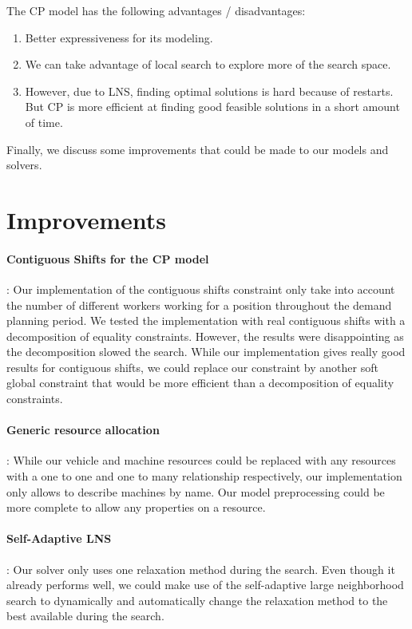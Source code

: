 \documentclass[../thesis.tex]{subfiles}
\begin{document}
The CP model has the following advantages / disadvantages:
\begin{enumerate}[leftmargin=1.5cm]
  \item Better expressiveness for its modeling.
  \item We can take advantage of local search to explore more of the search space.
  \item However, due to LNS, finding optimal solutions is hard because of restarts. But CP is more efficient at 
  finding good feasible solutions in a short amount of time.
\end{enumerate}



Finally, we discuss some improvements that could be made to our models and solvers.

\section{Improvements}

\paragraph{Contiguous Shifts for the CP model}: Our implementation of the contiguous shifts constraint only take into account 
the number of different workers working for a position throughout the demand planning period.
We tested the implementation with real contiguous shifts with a decomposition of equality constraints. However, the results 
were disappointing as the decomposition slowed the search. While our implementation gives really good results for contiguous shifts,
we could replace our constraint by another soft global constraint that would be more efficient than 
a decomposition of equality constraints.

\paragraph{Generic resource allocation}: While our vehicle and machine resources could be replaced with 
any resources with a one to one and one to many relationship respectively, our implementation only allows to describe
machines by name. Our model preprocessing could be more complete to allow any properties on a resource.

\paragraph{Self-Adaptive LNS}: Our solver only uses one relaxation method during the search. 
Even though it already performs well, we could make 
use of the self-adaptive large neighborhood search \cite{thomas:adaptive} to dynamically 
and automatically change the relaxation method to the best available during the search.
\end{document}
